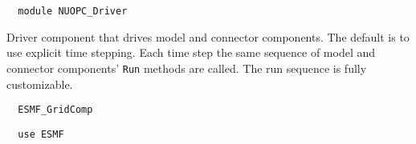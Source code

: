  
\setlength{\parskip}{0pt}
\setlength{\parindent}{0pt}
\setlength{\baselineskip}{11pt}
 
\def\bv{\begin{verbatim}}
\def\ev{\end{verbatim}}
\def\be{\begin{equation}}
\def\ee{\end{equation}}
\def\bea{\begin{eqnarray}}
\def\eea{\end{eqnarray}}
\def\bi{\begin{itemize}}
\def\ei{\end{itemize}}
\def\bn{\begin{enumerate}}
\def\en{\end{enumerate}}
\def\bd{\begin{description}}
\def\ed{\end{description}}
\def\({\left (}
\def\){\right )}
\def\[{\left [}
\def\]{\right ]}
\def\<{\left  \langle}
\def\>{\right \rangle}
\def\cI{{\cal I}}
\def\diag{\mathop{\rm diag}}
\def\tr{\mathop{\rm tr}}


\begin{verbatim}  module NUOPC_Driver
\end{verbatim}

Driver component that drives model and connector components. The default is to use explicit time stepping. Each time step the same sequence of model and connector components' {\tt Run} methods are called. The run sequence is fully customizable.

\begin{verbatim}  ESMF_GridComp
\end{verbatim}

\begin{verbatim}  use ESMF
\end{verbatim}


